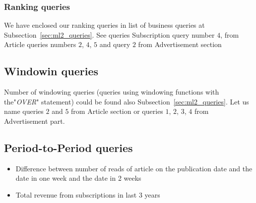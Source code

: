 \subsubsection{Ranking queries} %
\label{ssub:Ranking queries}
We have enclosed our ranking queries in list of business queries at Subsection~\ref{sec:ml2_queries}.
See queries Subscription query number $4$, from Article queries numbers $2$, $4$, $5$
and query $2$ from Advertisement section

\subsection{Windowin queries} %
\label{sub:Windowin queries}
Number of windowing queries (queries using windowing functions with the"{\it OVER}" statement)
could be found also Subsection~\ref{sec:ml2_queries}.
Let us name queries $2$ and $5$ from Article section or queries $1$, $2$, $3$, $4$ from Advertisement part.

\subsection{Period-to-Period queries} %
    \begin{itemize}
        \item Difference between number of reads of article on the publication date and the date in one week and the date in 2 weeks
        \item Total revenue from subscriptions in last 3 years
    \end{itemize}
\label{sub:Period-to-Period queries}

